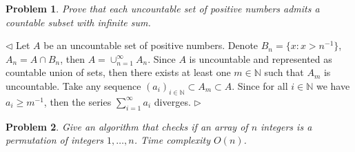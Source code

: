 \documentclass[12pt]{article}
\newtheorem{problem}{Problem}[subsection]
\newenvironment{solution}{\par $\triangleleft$}{$\triangleright$}
\begin{document}
\begin{problem} Prove that each uncountable set of positive numbers admits a
countable subset with infinite sum.
\end{problem}
\begin{solution} Let $A$ be an uncountable set of positive numbers. Denote $B_n=
        \{x: x>n^{-1}\}$, $A_n=A\cap B_n$, then $A=\cup_{n=1}^\infty A_n$. Since
    $A$ is uncountable and represented as countable  union of sets, then
    there exists at least one $m\in\mathbb{N}$ such that $A_m$ is
    uncountable. Take any sequence ${(a_i)}_{i\in\mathbb{N}}\subset
        A_m\subset A$. Since for all $i\in\mathbb{N}$ we have $a_i\geq m^{-1}$,
    then the series $\sum_{i=1}^\infty a_i$ diverges.
\end{solution}

\begin{problem} Give an algorithm that checks if an array of $n$ integers is a
permutation of integers ${1,\ldots,n}$.  Time complexity $O(n)$.
\end{problem}
\end{document}
